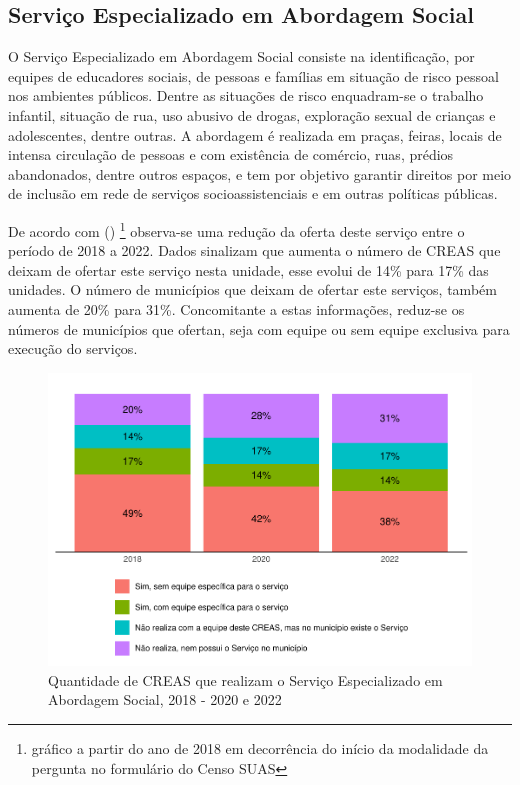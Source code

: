\documentclass[
  brazilian]{report}
\begin{document}
\hypertarget{serviuxe7o-especializado-em-abordagem-social}{%
\subsection{Serviço Especializado em Abordagem
Social}\label{serviuxe7o-especializado-em-abordagem-social}}

O Serviço Especializado em Abordagem Social consiste na identificação,
por equipes de educadores sociais, de pessoas e famílias em situação de
risco pessoal nos ambientes públicos. Dentre as situações de risco
enquadram-se o trabalho infantil, situação de rua, uso abusivo de
drogas, exploração sexual de crianças e adolescentes, dentre outras. A
abordagem é realizada em praças, feiras, locais de intensa circulação de
pessoas e com existência de comércio, ruas, prédios abandonados, dentre
outros espaços, e tem por objetivo garantir direitos por meio de
inclusão em rede de serviços socioassistenciais e em outras políticas
públicas.

De acordo com ()
\footnote{gráfico a partir do ano de 2018 em decorrência do início da modalidade da pergunta no formulário do Censo SUAS}
observa-se uma redução da oferta deste serviço entre o período de 2018 a
2022. Dados sinalizam que aumenta o número de CREAS que deixam de
ofertar este serviço nesta unidade, esse evolui de 14\% para 17\% das
unidades. O número de municípios que deixam de ofertar este serviços,
também aumenta de 20\% para 31\%. Concomitante a estas informações,
reduz-se os números de municípios que ofertan, seja com equipe ou sem
equipe exclusiva para execução do serviços.

\begin{figure}
\includegraphics{Censo-SUAS-2022_files/figure-latex/CREAS-abordagem-social-1} \caption[Quantidade de CREAS que realizam o Serviço Especializado em Abordagem Social, 2018 - 2020 e 2022]{Quantidade de CREAS que realizam o Serviço Especializado em Abordagem Social, 2018 - 2020 e 2022}\label{fig:CREAS-abordagem-social}
\end{figure}
\end{document}
